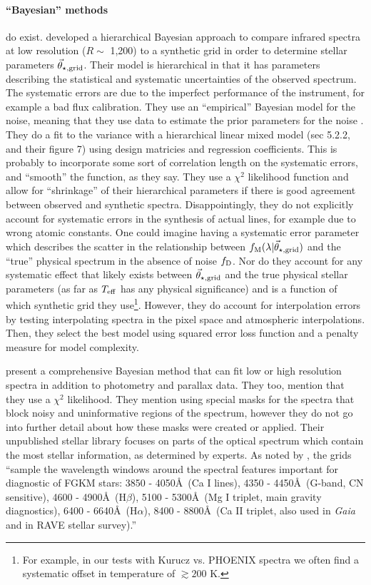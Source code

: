\documentclass[preprint]{aastex} %
\newcommand{\vt}{\vec{\theta}}
\newcommand{\vg}{\vt_{\star, {\rm grid}}}
\newcommand{\fM}{f_{\rm M}}
\newcommand{\fD}{f_{\rm D}}
\begin{document}
\paragraph{``Bayesian'' methods} do exist. \citet{sdm+07} developed a hierarchical Bayesian approach to compare infrared spectra at low resolution ($R \sim $ 1,200) to a synthetic grid in order to determine stellar parameters $\vg$. Their model is hierarchical in that it has parameters describing the statistical and systematic uncertainties of the observed spectrum. The systematic errors are due to the imperfect performance of the instrument, for example a bad flux calibration. They use an ``empirical'' Bayesian model for the noise, meaning that they use data to estimate the prior parameters for the noise \citep{gcs+04}. They do a fit to the variance with a hierarchical linear mixed model (sec 5.2.2, and their figure 7) using design matricies and regression coefficients. This is probably to incorporate some sort of correlation length on the systematic errors, and ``smooth'' the function, as they say. They use a $\chi^2$ likelihood function and allow for ``shrinkage'' of their hierarchical parameters if there is good agreement between observed and synthetic spectra. Disappointingly, they do not explicitly account for systematic errors in the synthesis of actual lines, for example due to wrong atomic constants. One could imagine having a systematic error parameter which describes the scatter in the relationship between $\fM(\lambda | \vg)$ and the ``true'' physical spectrum in the absence of noise $\fD$. Nor do they account for any systematic effect that likely exists between $\vg$ and the true physical stellar parameters (as far as $T_{\rm eff}$ has any physical significance) and is a function of which synthetic grid they use\footnote{For example, in our tests with Kurucz vs. PHOENIX spectra we often find a systematic offset in temperature of $\gtrsim 200$ K.}. However, they do account for interpolation errors by testing interpolating spectra in the pixel space and atmospheric interpolations. Then, they select the best model using squared error loss function and a penalty measure for model complexity.

\citet{sb13} present a comprehensive Bayesian method that can fit low or high resolution spectra in addition to photometry and parallax data. They too, mention that they use a $\chi^2$ likelihood. They mention using special masks for the spectra that block noisy and uninformative regions of the spectrum, however they do not go into further detail about how these masks were created or applied. Their unpublished stellar library focuses on parts of the optical spectrum which contain the most stellar information, as determined by experts. As noted by \citet{sb13}, the grids ``sample the wavelength windows around the spectral features important for diagnostic of FGKM stars: 3850 - 4050\AA\ (Ca I lines), 4350 - 4450\AA\ (G-band, CN sensitive), 4600 - 4900\AA\ (H$\beta$), 5100 - 5300\AA\ (Mg I triplet, main gravity diagnostics), 6400 - 6640\AA\ (H$\alpha$), 8400 - 8800\AA\ (Ca II triplet, also used in \emph{Gaia} and in RAVE stellar survey).'' 
\end{document}
